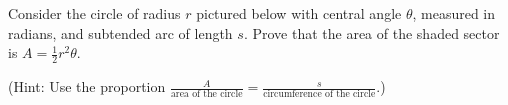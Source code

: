 {Consider the circle of radius $r$ pictured below with central angle $\theta$, measured in radians,  and subtended arc of length $s$.  Prove that the area of the shaded sector is $A = \frac{1}{2} r^{2} \theta$. 

(Hint: Use the proportion  $\frac{A}{\text{area of the circle}} = \frac{s}{\text{circumference of the circle}}$.)
\label{circularsectorarea}

\begin{center}
\end{center}}
{}